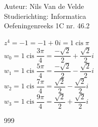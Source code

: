 \documentclass[a4paper]{article}
\newcommand{\cis}{\operatorname{cis}}
\begin{document}
  
\noindent \large Auteur: Nils Van de Velde \\
\noindent \large Studierichting: Informatica\\
\noindent \large Oefeningenreeks 1C nr. 46.2\\

\medskip

\normalsize

$z^4 = -1 = -1 + 0i = 1 \cis\pi$\\

$w_0 = 1\cis\dfrac{3\pi}{4} = \dfrac{-\sqrt{2}}{2} + \dfrac{\sqrt{2}}{2}i$\\

$w_1 = 1\cis\dfrac{5\pi}{4} = \dfrac{-\sqrt{2}}{2} - \dfrac{\sqrt{2}}{2}i$\\

$w_2 = 1\cis\dfrac{7\pi}{4} = \dfrac{\sqrt{2}}{2} - \dfrac{\sqrt{2}}{2}i$\\

$w_3 = 1\cis\dfrac{9\pi}{4} = \dfrac{\sqrt{2}}{2} + \dfrac{\sqrt{2}}{2}i$\\

\begin{thebibliography}{999}
\end{thebibliography}
\end{document}
